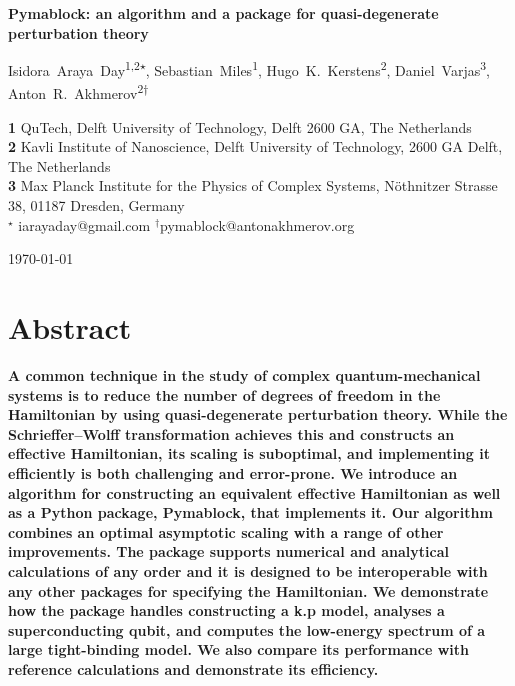 \documentclass[submission, Codebases]{SciPost}
\begin{document}
\begin{center}
{\Large \textbf{Pymablock: an algorithm and a package for quasi-degenerate perturbation theory}}
\end{center}

\begin{center}
Isidora~Araya~Day\textsuperscript{1,2$\star$},
Sebastian~Miles\textsuperscript{1},
Hugo~K.~Kerstens\textsuperscript{2},
Daniel~Varjas\textsuperscript{3},
Anton~R.~Akhmerov\textsuperscript{2$\dagger$}
\end{center}

\begin{center}
\textbf{1} QuTech, Delft University of Technology, Delft 2600 GA, The Netherlands \\
\textbf{2} Kavli Institute of Nanoscience, Delft University of Technology, 2600 GA Delft, The Netherlands \\
\textbf{3} Max Planck Institute for the Physics of Complex Systems, Nöthnitzer Strasse 38, 01187 Dresden, Germany \\
${}^\star$ {\small \sf iarayaday@gmail.com}
${}^\dagger${\small \sf pymablock@antonakhmerov.org}
\end{center}

\begin{center}
    \today
\end{center}

\section*{Abstract}
\textbf{
A common technique in the study of complex quantum-mechanical systems is to reduce the number of degrees of freedom in the Hamiltonian by using quasi-degenerate perturbation theory.
While the Schrieffer--Wolff transformation achieves this and constructs an effective Hamiltonian, its scaling is suboptimal, and implementing it efficiently is both challenging and error-prone.
We introduce an algorithm for constructing an equivalent effective Hamiltonian as well as a Python package, Pymablock, that implements it.
Our algorithm combines an optimal asymptotic scaling with a range of other improvements.
The package supports numerical and analytical calculations of any order and it is designed to be interoperable with any other packages for specifying the Hamiltonian.
We demonstrate how the package handles constructing a k.p model, analyses a superconducting qubit, and computes the low-energy spectrum of a large tight-binding model.
We also compare its performance with reference calculations and demonstrate its efficiency.
}
\end{document}
